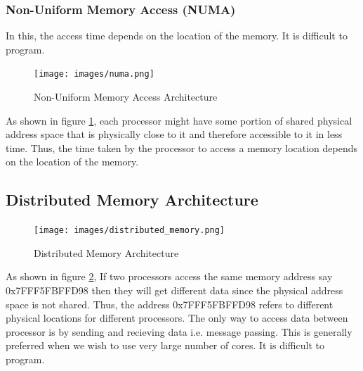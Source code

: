 \documentclass[12pt]{book}
\begin{document}
\subsubsection{Non-Uniform Memory Access (NUMA)}
In this, the access time depends on the location of the memory. It is difficult to program.
\begin{figure}[H]
    \centering
    \texttt{[image: images/numa.png]}
    \caption{Non-Uniform Memory Access Architecture}
    \label{fig:numa}
\end{figure}
As shown in figure \ref{fig:numa}, each processor might have some portion of shared physical address space that is physically close to it and
therefore accessible to it in less time. Thus, the time taken by the processor to access a memory location depends on the location of the memory.

\subsection{Distributed Memory Architecture}
\begin{figure}[H]
    \centering
    \texttt{[image: images/distributed\_memory.png]}
    \caption{Distributed Memory Architecture}
    \label{fig:distributed_memory}
\end{figure}
As shown in figure \ref{fig:distributed_memory},
If two processors access the same memory address say 0x7FFF5FBFFD98 then they will get different data since 
the physical address space is not shared. Thus, the address 0x7FFF5FBFFD98 refers to different physical locations for different processors.
The only way to access data between processor is by sending and recieving data i.e. message passing.
This is generally preferred when we wish to use very large number of cores.
It is difficult to program.
\end{document}
